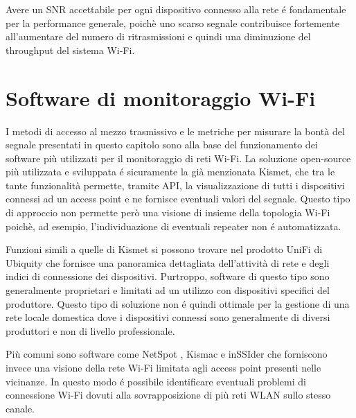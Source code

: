 Avere un SNR accettabile per ogni dispositivo connesso alla rete \'e fondamentale per la performance generale, poich\`e uno scarso segnale contribuisce fortemente all'aumentare del numero di ritrasmissioni e quindi una diminuzione del throughput del sistema Wi-Fi.

\section{Software di monitoraggio Wi-Fi}

I metodi di accesso al mezzo trasmissivo e le metriche per misurare la bont\`a del segnale presentati in questo capitolo sono alla base del funzionamento dei software pi\`u utilizzati per il monitoraggio di reti Wi-Fi.
La soluzione open-source pi\`u utilizzata e sviluppata \'e sicuramente la gi\`a menzionata Kismet, che tra le tante funzionalit\`a permette, tramite API, la visualizzazione di tutti i dispositivi connessi ad un access point e ne fornisce eventuali valori del segnale.
Questo tipo di approccio non permette per\`o una visione di insieme della topologia Wi-Fi poich\`e, ad esempio, l'individuazione di eventuali repeater non \'e automatizzata.

Funzioni simili a quelle di Kismet si possono trovare nel prodotto UniFi \cite{unifi} di Ubiquity che fornisce una panoramica dettagliata dell'attivit\`a di rete e degli indici di connessione dei dispositivi.
Purtroppo, software di questo tipo sono generalmente proprietari e limitati ad un utilizzo con dispositivi specifici del produttore.
Questo tipo di soluzione non \'e quindi ottimale per la gestione di una rete locale domestica dove i dispositivi connessi sono generalmente di diversi produttori e non di livello professionale.

Pi\`u comuni sono software come NetSpot \cite{netspot}, Kismac e inSSIder \cite{inssider} che forniscono invece una visione della rete Wi-Fi limitata agli access point presenti nelle vicinanze.
In questo modo \'e possibile identificare eventuali problemi di connessione Wi-Fi dovuti alla sovrapposizione di pi\`u reti WLAN sullo stesso canale.
